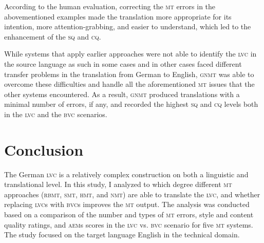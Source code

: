 \documentclass[output=paper]{langsci/langscibook}
\begin{document}
According to the human evaluation, correcting the \textsc{mt} errors in the abovementioned examples made the translation more appropriate for its intention, more attention-grabbing, and easier to understand, which led to the enhancement of the \textsc{sq} and \textsc{cq}.

While systems that apply earlier approaches were not able to identify the \textsc{lvc} in the source language as such in some cases and in other cases faced different transfer problems in the translation from German to English, \textsc{gnmt} was able to overcome these difficulties and handle all the aforementioned \textsc{mt} issues that the other systems encountered. As a result, \textsc{gnmt} produced translations with a minimal number of errors, if any, and recorded the highest \textsc{sq} and \textsc{cq} levels both in the \textsc{lvc} and the \textsc{bvc} scenarios.


\section{Conclusion}\label{marzouk:con}\largerpage[-2]
The German \textsc{lvc} is a relatively complex construction on both a linguistic and translational level. In this study, I analyzed to which degree different \textsc{mt} approaches (\textsc{rbmt}, \textsc{smt}, \textsc{hmt}, and \textsc{nmt}) are able to translate the \textsc{lvc}, and whether replacing \textsc{lvc}s with \textsc{bvc}s improves the \textsc{mt} output. The analysis was conducted based on a comparison of the number and types of \textsc{mt} errors, style and content quality ratings, and \textsc{aem}s scores in the \textsc{lvc} vs. \textsc{bvc} scenario for five \textsc{mt} systems. The study focused on the target language English in the technical domain.
\end{document}
